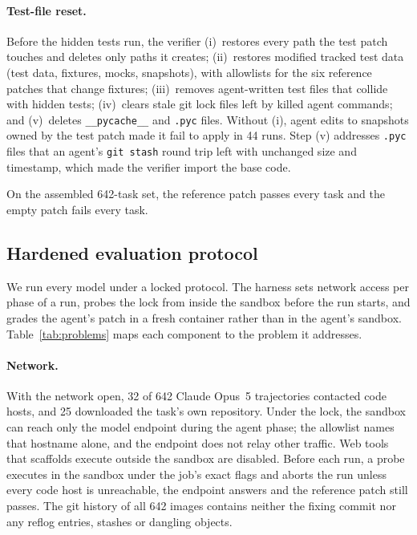\paragraph{Test-file reset.}
Before the hidden tests run, the verifier (i)~restores every path the test patch touches and deletes only paths it creates; (ii)~restores modified tracked test data (test data, fixtures, mocks, snapshots), with allowlists for the six reference patches that change fixtures; (iii)~removes agent-written test files that collide with hidden tests; (iv)~clears stale git lock files left by killed agent commands; and (v)~deletes \texttt{\_\_pycache\_\_} and \texttt{.pyc} files. Without (i), agent edits to snapshots owned by the test patch made it fail to apply in 44 runs. Step (v) addresses \texttt{.pyc} files that an agent's \texttt{git stash} round trip left with unchanged size and timestamp, which made the verifier import the base code.

On the assembled 642-task set, the reference patch passes every task and the empty patch fails every task.

\subsection{Hardened evaluation protocol}
\label{sec:protocol}

We run every model under a locked protocol. The harness sets network access per phase of a run, probes the lock from inside the sandbox before the run starts, and grades the agent's patch in a fresh container rather than in the agent's sandbox. Table~\ref{tab:problems} maps each component to the problem it addresses.

\paragraph{Network.}
With the network open, 32 of 642 Claude Opus~5 trajectories contacted code hosts, and 25 downloaded the task's own repository. Under the lock, the sandbox can reach only the model endpoint during the agent phase; the allowlist names that hostname alone, and the endpoint does not relay other traffic. Web tools that scaffolds execute outside the sandbox are disabled. Before each run, a probe executes in the sandbox under the job's exact flags and aborts the run unless every code host is unreachable, the endpoint answers and the reference patch still passes. The git history of all 642 images contains neither the fixing commit nor any reflog entries, stashes or dangling objects.

